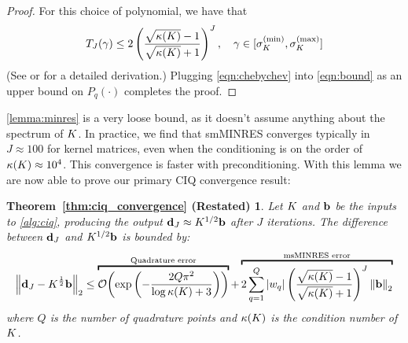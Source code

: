 \begin{proof}
  For this choice of polynomial, we have that
  \begin{equation}
    T_J( \gamma )
    \leq 2 \left( \frac{
      \sqrt{\kappa(K)} - 1
    }{
      \sqrt{\kappa(K)} + 1
    }\right)^J,
    \quad
    \gamma \in [\sigma^{(\min)}_{K}, \sigma^{(\max)}_{K}]
    \label{eqn:chebychev}
  \end{equation}
  (See \citep[e.g.][Sec. 9.2]{shewchuk1994introduction} or \citep[e.g.][Thm. 38.5]{trefethen1997numerical} for a detailed derivation.)
  Plugging \cref{eqn:chebychev} into \cref{eqn:bound} as an upper bound on $P_q(\cdot)$ completes the proof.
\end{proof}

\cref{lemma:minres} is a very loose bound, as it doesn't assume anything about the spectrum of $K$.
In practice, we find that smMINRES converges typically in $J \approx 100$ for kernel matrices, even when the conditioning is on the order of $\kappa(K) \approx 10^4$.
This convergence is faster with preconditioning.
With this lemma we are now able to prove our primary CIQ convergence result:
%
\newtheorem*{thm:ciq_convergence}{Theorem~\ref{thm:ciq_convergence} (Restated)}
\begin{thm:ciq_convergence}
  Let $K$ and $\mathbf{b}$ be the inputs to \cref{alg:ciq}, producing the output $\mathbf{d}_J \approx K^{1/2} \mathbf{b}$ after $J$ iterations.
  The difference between $\mathbf{d}_J$ and $K^{1/2} \mathbf{b}$ is bounded by:
  \begin{equation*}
    \left\Vert \bd_J - \bK^{\frac 1 2} \bb \right\Vert_2
    \leq
    \overbracket{
      \bigo{\exp\left( -\frac{2 Q \pi^2}{\log \kappa(\bK) + 3} \right)}
    }^{\text{Quadrature error}}
    +
    \overbracket{
      2 \sum_{q=1}^Q \left\vert w_q \right\vert
      \left( \frac{ \sqrt{\kappa(\bK)} - 1}{ \sqrt{\kappa(\bK)} + 1} \right)^J
      \left\Vert \bb \right\Vert_2
    }^{\text{msMINRES error}}
  \end{equation*}
  where $Q$ is the number of quadrature points and $\kappa(K)$ is the condition number of $K$.
\end{thm:ciq_convergence}
%
